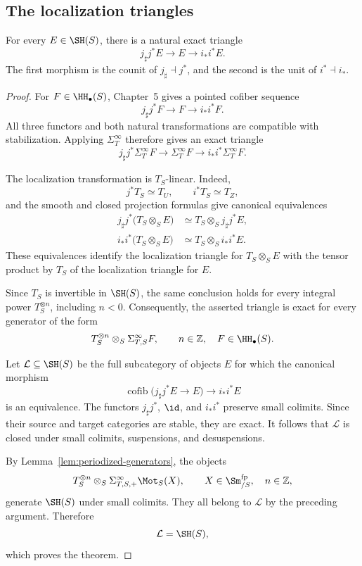 \subsection{The localization triangles}

\begin{theorem}
\label{thm:stable-localization}
For every \(E\in\SH(S)\), there is a natural exact triangle
\[
    j_\sharp j^*E
    \longrightarrow
    E
    \longrightarrow
    i_*i^*E.
\]
The first morphism is the counit of \(j_\sharp\dashv j^*\), and the second
is the unit of \(i^*\dashv i_*\).
\end{theorem}

\begin{proof}
For \(F\in\HH_\bullet(S)\), Chapter~5 gives a pointed cofiber sequence
\[
    j_\sharp j^*F
    \longrightarrow
    F
    \longrightarrow
    i_*i^*F.
\]
All three functors and both natural transformations are compatible with
stabilization.  Applying \(\Sigma_T^\infty\) therefore gives an exact
triangle
\[
    j_\sharp j^*\Sigma_T^\infty F
    \longrightarrow
    \Sigma_T^\infty F
    \longrightarrow
    i_*i^*\Sigma_T^\infty F.
\]

The localization transformation is \(T_S\)-linear.  Indeed,
\[
    j^*T_S\simeq T_U,
    \qquad
    i^*T_S\simeq T_Z,
\]
and the smooth and closed projection formulas give canonical equivalences
\[
\begin{aligned}
    j_\sharp j^*
    \bigl(
      T_S\otimes_SE
    \bigr)
    &\simeq
    T_S\otimes_Sj_\sharp j^*E, \\
    i_*i^*
    \bigl(
      T_S\otimes_SE
    \bigr)
    &\simeq
    T_S\otimes_Si_*i^*E.
\end{aligned}
\]
These equivalences identify the localization triangle for
\(T_S\otimes_SE\) with the tensor product by \(T_S\) of the localization
triangle for \(E\).

Since \(T_S\) is invertible in \(\SH(S)\), the same conclusion holds for
every integral power \(T_S^{\otimes n}\), including \(n<0\).  Consequently,
the asserted triangle is exact for every generator of the form
\[
    T_S^{\otimes n}
    \otimes_S
    \Sigma_{T,S}^\infty F,
    \qquad
    n\in\mathbb Z,
    \quad
    F\in\HH_\bullet(S).
\]

Let \(\mathcal L\subseteq\SH(S)\) be the full subcategory of objects \(E\)
for which the canonical morphism
\[
    \operatorname{cofib}
    \bigl(
      j_\sharp j^*E\longrightarrow E
    \bigr)
    \longrightarrow
    i_*i^*E
\]
is an equivalence.  The functors \(j_\sharp j^*\), \(\id\), and \(i_*i^*\)
preserve small colimits.  Since their source and target categories are
stable, they are exact.  It follows that \(\mathcal L\) is closed under small
colimits, suspensions, and desuspensions.

By Lemma~\ref{lem:periodized-generators}, the objects
\[
    T_S^{\otimes n}
    \otimes_S
    \Sigma_{T,S,+}^\infty\Mot_S(X),
    \qquad
    X\in\Sm^{\mathrm{fp}}_{/S},
    \quad
    n\in\mathbb Z,
\]
generate \(\SH(S)\) under small colimits.  They all belong to
\(\mathcal L\) by the preceding argument.  Therefore
\[
    \mathcal L=\SH(S),
\]
which proves the theorem.
\end{proof}

